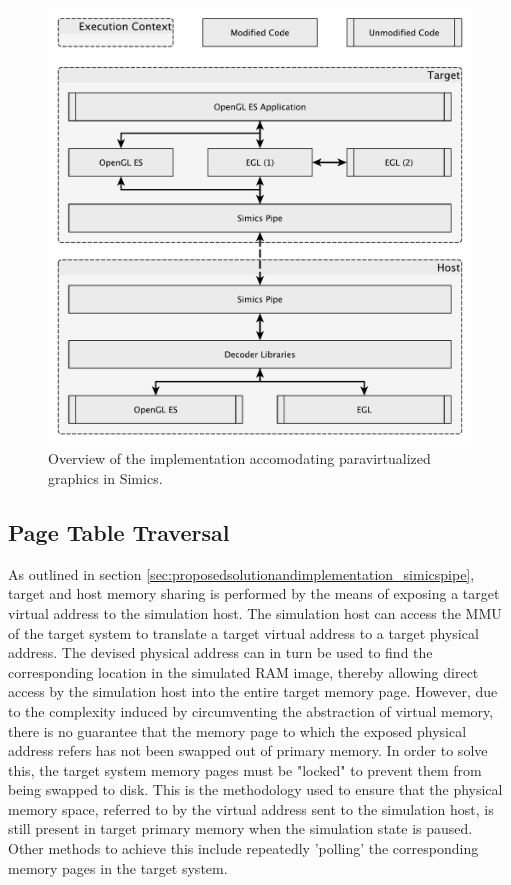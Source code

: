 \begin{figure}
\centering
\includegraphics[width=\linewidth]{img/yedoverview.pdf}
\caption[Paravirtualization implementation overview]{Overview of the implementation accomodating paravirtualized graphics in Simics.}
\label{fig:overview}
\end{figure}

\subsection{Page Table Traversal}
\label{sec:proposedsolutionandimplementation_pagetabletraversal}
As outlined in section \ref{sec:proposedsolutionandimplementation_simicspipe}, target and host memory sharing is performed by the means of exposing a target virtual address to the simulation host.
The simulation host can access the MMU of the target system to translate a target virtual address to a target physical address.
The devised physical address can in turn be used to find the corresponding location in the simulated RAM image, thereby allowing direct access by the simulation host into the entire target memory page.
However, due to the complexity induced by circumventing the abstraction of virtual memory, there is no guarantee that the memory page to which the exposed physical address refers has not been swapped out of primary memory.
In order to solve this, the target system memory pages must be "locked" to prevent them from being swapped to disk.
This is the methodology used to ensure that the physical memory space, referred to by the virtual address sent to the simulation host, is still present in target primary memory when the simulation state is paused.
Other methods to achieve this include repeatedly 'polling' the corresponding memory pages in the target system.

